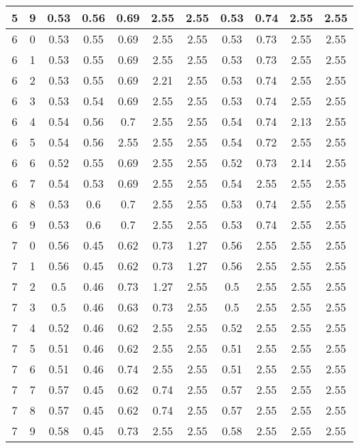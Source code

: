 \begin{longtable}{|c|c||c||c|c|c|c||c|c|c|c|}
	5 & 9 & 0.53 & 0.56 & 0.69 & 2.55 & 2.55 & 0.53 & 0.74 & 2.55 & 2.55 \\ \hline
	6 & 0 & 0.53 & 0.55 & 0.69 & 2.55 & 2.55 & 0.53 & 0.73 & 2.55 & 2.55 \\ \hline
	6 & 1 & 0.53 & 0.55 & 0.69 & 2.55 & 2.55 & 0.53 & 0.73 & 2.55 & 2.55 \\ \hline
	6 & 2 & 0.53 & 0.55 & 0.69 & 2.21 & 2.55 & 0.53 & 0.74 & 2.55 & 2.55 \\ \hline
	6 & 3 & 0.53 & 0.54 & 0.69 & 2.55 & 2.55 & 0.53 & 0.74 & 2.55 & 2.55 \\ \hline
	6 & 4 & 0.54 & 0.56 & 0.7 & 2.55 & 2.55 & 0.54 & 0.74 & 2.13 & 2.55 \\ \hline
	6 & 5 & 0.54 & 0.56 & 2.55 & 2.55 & 2.55 & 0.54 & 0.72 & 2.55 & 2.55 \\ \hline
	6 & 6 & 0.52 & 0.55 & 0.69 & 2.55 & 2.55 & 0.52 & 0.73 & 2.14 & 2.55 \\ \hline
	6 & 7 & 0.54 & 0.53 & 0.69 & 2.55 & 2.55 & 0.54 & 2.55 & 2.55 & 2.55 \\ \hline
	6 & 8 & 0.53 & 0.6 & 0.7 & 2.55 & 2.55 & 0.53 & 0.74 & 2.55 & 2.55 \\ \hline
	6 & 9 & 0.53 & 0.6 & 0.7 & 2.55 & 2.55 & 0.53 & 0.74 & 2.55 & 2.55 \\ \hline
	7 & 0 & 0.56 & 0.45 & 0.62 & 0.73 & 1.27 & 0.56 & 2.55 & 2.55 & 2.55 \\ \hline
	7 & 1 & 0.56 & 0.45 & 0.62 & 0.73 & 1.27 & 0.56 & 2.55 & 2.55 & 2.55 \\ \hline
	7 & 2 & 0.5 & 0.46 & 0.73 & 1.27 & 2.55 & 0.5 & 2.55 & 2.55 & 2.55 \\ \hline
	7 & 3 & 0.5 & 0.46 & 0.63 & 0.73 & 2.55 & 0.5 & 2.55 & 2.55 & 2.55 \\ \hline
	7 & 4 & 0.52 & 0.46 & 0.62 & 2.55 & 2.55 & 0.52 & 2.55 & 2.55 & 2.55 \\ \hline
	7 & 5 & 0.51 & 0.46 & 0.62 & 2.55 & 2.55 & 0.51 & 2.55 & 2.55 & 2.55 \\ \hline
	7 & 6 & 0.51 & 0.46 & 0.74 & 2.55 & 2.55 & 0.51 & 2.55 & 2.55 & 2.55 \\ \hline
	7 & 7 & 0.57 & 0.45 & 0.62 & 0.74 & 2.55 & 0.57 & 2.55 & 2.55 & 2.55 \\ \hline
	7 & 8 & 0.57 & 0.45 & 0.62 & 0.74 & 2.55 & 0.57 & 2.55 & 2.55 & 2.55 \\ \hline
	7 & 9 & 0.58 & 0.45 & 0.73 & 2.55 & 2.55 & 0.58 & 2.55 & 2.55 & 2.55 \\ \hline
\end{longtable}
\clearpage{}
